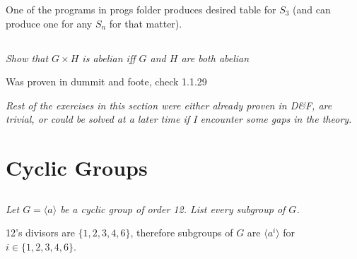 \documentclass[11pt,oneside,titlepage]{book}
\newcommand{\eangle}[1]{\langle #1 \rangle}
\newcommand{\set}[1]{\{ #1 \}}
\begin{document}
One of the programs in progs folder produces desired table for $S_3$ (and can
produce one for any $S_n$ for that matter).

\subsection{}

\textit{Show that $G \times H$ is abelian iff $G$ and $H$ are both abelian}

Was proven in dummit and foote, check 1.1.29

\textit{Rest of the exercises in this section were either already proven in D\&F, are trivial, or
could be solved at a later time if I encounter some gaps in the theory.}

\section{}
\section{}
\section{}

\section{Cyclic Groups}

\subsection{}

\textit{Let $G = \eangle{a}$ be a cyclic group of order 12. List every subgroup of $G$.}

12's divisors are $\set{1, 2, 3, 4, 6}$, therefore subgroups of $G$ are
$\eangle{a^i}$ for $i \in \set{1, 2, 3, 4, 6}$. 
\end{document}
